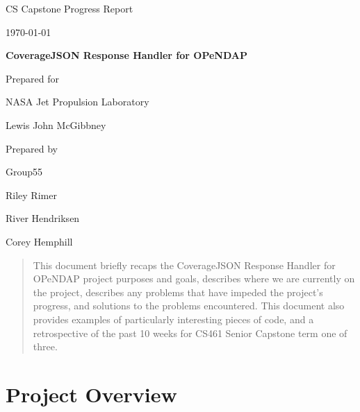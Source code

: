 \documentclass[onecolumn, draftclsnofoot,10pt, compsoc]{IEEEtran}
\def \CapstoneTeamNumber{55}
\def \GroupMemberOne{Riley Rimer}
\def \GroupMemberTwo{River Hendriksen}
\def \GroupMemberThree{Corey Hemphill}
\def \CapstoneProjectName{CoverageJSON Response Handler for OPeNDAP}
\def \CapstoneSponsorCompany{NASA Jet Propulsion Laboratory}
\def \CapstoneSponsorPerson{Lewis John McGibbney}
\def \DocType{	%
				Progress Report
				}
\newcommand{\NameSigPair}[1]{\par
\makebox[2.75in][r]{#1} \hfil 	\makebox[3.25in]{\makebox[2.25in]{\hrulefill} \hfill		\makebox[.75in]{\hrulefill}}
\par\vspace{-12pt} \textit{\tiny\noindent
\makebox[2.75in]{} \hfil	\makebox[3.25in]{\makebox[2.25in][r]{Signature} \hfill	\makebox[.75in][r]{Date}}}}
\renewcommand{\NameSigPair}[1]{#1}
\begin{document}
\begin{titlepage}
    \begin{singlespace}
        \hfill    
        \par\vspace{.2in}
        \centering
        \scshape{
            \huge CS Capstone \DocType \par
            {\large\today}\par
            \vspace{.5in}
            \textbf{\Huge\CapstoneProjectName}\par
                        \vspace{.5in}

            \vfill
            {\large Prepared for}\par
            \Huge \CapstoneSponsorCompany\par
            \vspace{5pt}
            {\Large\NameSigPair{\CapstoneSponsorPerson}\par}
            {\large Prepared by }\par
            Group\CapstoneTeamNumber\par
            \vspace{5pt}
            {\Large
                \NameSigPair{\GroupMemberOne}\par
                \NameSigPair{\GroupMemberTwo}\par
                \NameSigPair{\GroupMemberThree}\par
            }
            \vspace{20pt}
        }
        \begin{abstract}
        	This document briefly recaps the CoverageJSON Response Handler for OPeNDAP project purposes and goals, describes where we are currently on the project, describes any problems that have impeded the project's progress, and solutions to the problems encountered. This document also provides examples of particularly interesting pieces of code, and a retrospective of the past 10 weeks for CS461 Senior Capstone term one of three.
        \end{abstract}
    \end{singlespace}
\end{titlepage}
\newpage
{}
\tableofcontents
\clearpage
\section{Project Overview}
\end{document}
